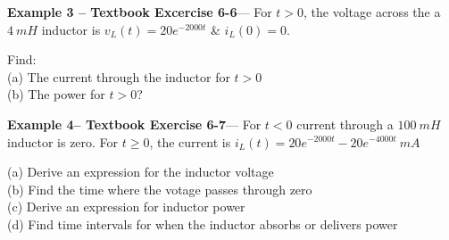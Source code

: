 \documentclass{handout}
\begin{document}
\textbf{Example 3 -- Textbook Excercise 6-6}--- For $t>0$, the voltage across the a $4\ mH$ inductor is $v_L(t) = 20e^{-2000t}$ \& $i_L(0) = 0$.

Find:\\
(a) The current through the inductor for $t>0$ \\
(b) The power for $t>0$?


\newpage
\clearpage
\pagebreak

\textbf{Example 4-- Textbook Exercise 6-7}--- For $t<0$ current through a $100\ mH$ inductor is zero.  For $t\ge 0$, the current is $i_L(t) = 20e^{-2000t}-20e^{-4000t}\ mA$

(a) Derive an expression for the inductor voltage\\
(b) Find the time where the votage passes through zero\\
(c) Derive an expression for inductor power\\
(d) Find time intervals for when the inductor absorbs or delivers power\\
\end{document}
